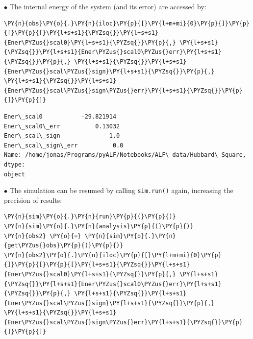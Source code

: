     \(\bullet\) The internal energy of the system (and its error) are
accessed by:

    \begin{tcolorbox}[breakable, size=fbox, boxrule=1pt, pad at break*=1mm,colback=cellbackground, colframe=cellborder]
\begin{Verbatim}[commandchars=\\\{\}]
\PY{n}{obs}\PY{o}{.}\PY{n}{iloc}\PY{p}{[}\PY{l+m+mi}{0}\PY{p}{]}\PY{p}{[}\PY{p}{[}\PY{l+s+s1}{\PYZsq{}}\PY{l+s+s1}{Ener\PYZus{}scal0}\PY{l+s+s1}{\PYZsq{}}\PY{p}{,} \PY{l+s+s1}{\PYZsq{}}\PY{l+s+s1}{Ener\PYZus{}scal0\PYZus{}err}\PY{l+s+s1}{\PYZsq{}}\PY{p}{,} \PY{l+s+s1}{\PYZsq{}}\PY{l+s+s1}{Ener\PYZus{}scal\PYZus{}sign}\PY{l+s+s1}{\PYZsq{}}\PY{p}{,} \PY{l+s+s1}{\PYZsq{}}\PY{l+s+s1}{Ener\PYZus{}scal\PYZus{}sign\PYZus{}err}\PY{l+s+s1}{\PYZsq{}}\PY{p}{]}\PY{p}{]}
\end{Verbatim}
\end{tcolorbox}

            \begin{tcolorbox}[breakable, size=fbox, boxrule=.5pt, pad at break*=1mm, opacityfill=0]
\begin{Verbatim}[commandchars=\\\{\}]
Ener\_scal0           -29.821914
Ener\_scal0\_err          0.13032
Ener\_scal\_sign              1.0
Ener\_scal\_sign\_err          0.0
Name: /home/jonas/Programs/pyALF/Notebooks/ALF\_data/Hubbard\_Square, dtype:
object
\end{Verbatim}
\end{tcolorbox}
        
    \(\bullet\) The simulation can be resumed by calling \texttt{sim.run()}
again, increasing the precision of results:

    \begin{tcolorbox}[breakable, size=fbox, boxrule=1pt, pad at break*=1mm,colback=cellbackground, colframe=cellborder]
\begin{Verbatim}[commandchars=\\\{\}]
\PY{n}{sim}\PY{o}{.}\PY{n}{run}\PY{p}{(}\PY{p}{)}
\PY{n}{sim}\PY{o}{.}\PY{n}{analysis}\PY{p}{(}\PY{p}{)}
\PY{n}{obs2} \PY{o}{=} \PY{n}{sim}\PY{o}{.}\PY{n}{get\PYZus{}obs}\PY{p}{(}\PY{p}{)}
\PY{n}{obs2}\PY{o}{.}\PY{n}{iloc}\PY{p}{[}\PY{l+m+mi}{0}\PY{p}{]}\PY{p}{[}\PY{p}{[}\PY{l+s+s1}{\PYZsq{}}\PY{l+s+s1}{Ener\PYZus{}scal0}\PY{l+s+s1}{\PYZsq{}}\PY{p}{,} \PY{l+s+s1}{\PYZsq{}}\PY{l+s+s1}{Ener\PYZus{}scal0\PYZus{}err}\PY{l+s+s1}{\PYZsq{}}\PY{p}{,} \PY{l+s+s1}{\PYZsq{}}\PY{l+s+s1}{Ener\PYZus{}scal\PYZus{}sign}\PY{l+s+s1}{\PYZsq{}}\PY{p}{,} \PY{l+s+s1}{\PYZsq{}}\PY{l+s+s1}{Ener\PYZus{}scal\PYZus{}sign\PYZus{}err}\PY{l+s+s1}{\PYZsq{}}\PY{p}{]}\PY{p}{]}
\end{Verbatim}
\end{tcolorbox}

